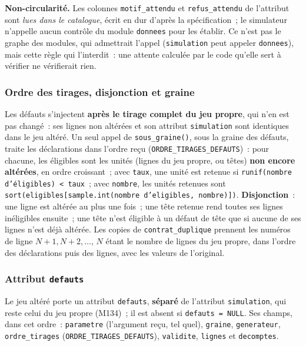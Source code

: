 \documentclass[a4paper,11pt]{article}
\newcommand{\code}[1]{\texttt{\small #1}}
\begin{document}
\medskip
\noindent
\textbf{Non-circularité.} Les colonnes \code{motif\_attendu} et
\code{refus\_attendu} de l'attribut sont \emph{lues dans le catalogue},
écrit en dur d'après la spécification~; le simulateur n'appelle aucun
contrôle du module \code{donnees} pour les établir. Ce n'est pas le graphe
des modules, qui admettrait l'appel (\code{simulation} peut appeler
\code{donnees}), mais cette règle qui l'interdit~: une attente calculée par
le code qu'elle sert à vérifier ne vérifierait rien.

\subsubsection*{Ordre des tirages, disjonction et graine}

Les défauts s'injectent \textbf{après le tirage complet du jeu propre}, qui
n'en est pas changé~: ses lignes non altérées et son attribut
\code{simulation} sont identiques dans le jeu altéré. Un seul appel de
\code{sous\_graine()}, sous la graine des défauts, traite les déclarations
dans l'ordre reçu (\code{ORDRE\_TIRAGES\_DEFAUTS})~: pour chacune, les
éligibles sont les unités (lignes du jeu propre, ou têtes) \textbf{non
encore altérées}, en ordre croissant~; avec \code{taux}, une unité est
retenue si \code{runif(nombre d'éligibles) < taux}~; avec \code{nombre}, les
unités retenues sont \code{sort(eligibles[sample.int(nombre d'eligibles, nombre)])}.
\textbf{Disjonction}~: une ligne est altérée au plus une fois~; une tête
retenue rend toutes ses lignes inéligibles ensuite~; une tête n'est
éligible à un défaut de tête que si aucune de ses lignes n'est déjà
altérée. Les copies de \code{contrat\_duplique} prennent les numéros de
ligne $N + 1, N + 2, \dots$, $N$ étant le nombre de lignes du jeu propre,
dans l'ordre des déclarations puis des lignes, avec les valeurs de
l'original.

\subsubsection*{Attribut \code{defauts}}

Le jeu altéré porte un attribut \code{defauts}, \textbf{séparé} de
l'attribut \code{simulation}, qui reste celui du jeu propre (M134)~; il
est absent si \code{defauts = NULL}. Ses champs, dans cet ordre~:
\code{parametre} (l'argument reçu, tel quel), \code{graine},
\code{generateur}, \code{ordre\_tirages} (\code{ORDRE\_TIRAGES\_DEFAUTS}),
\code{validite}, \code{lignes} et \code{decomptes}.
\end{document}
